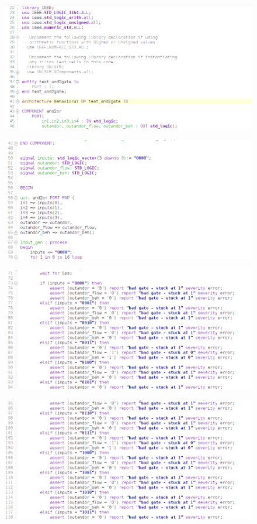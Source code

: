 \documentclass[12pt,a4paper]{article}
\begin{document}
\begin{figure}[H]
    \centering
    \includegraphics[scale=0.25]{images/code 1.png}
\end{figure}
\begin{figure}[H]
    \centering
    \includegraphics[scale=0.25]{images/code 2.png}
\end{figure}
\begin{figure}[H]
    \centering
    \includegraphics[scale=0.25]{images/code 3.png}
\end{figure}
\begin{figure}[H]
    \centering
    \includegraphics[scale=0.25]{images/code 4.png}
\end{figure}
\end{document}
